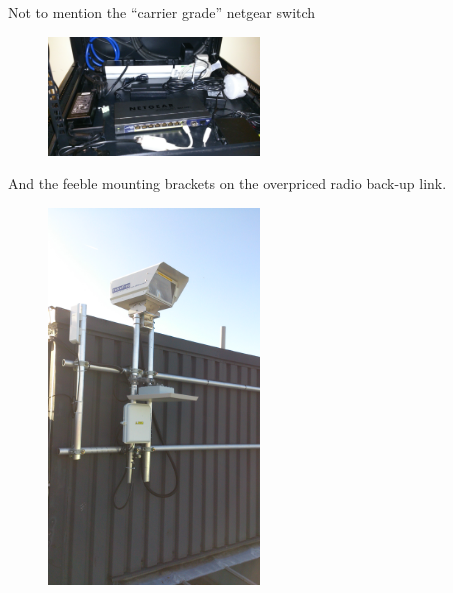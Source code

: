 Not to mention the ``carrier grade'' netgear switch
\begin{figure}[h]
  \begin{center}
    \includegraphics[width=0.5\textwidth]{carrier-grade}
  \end{center}
\end{figure}

And the feeble mounting brackets on the overpriced radio back-up link.
\begin{figure}[h]
  \begin{center}
    \includegraphics[angle=-90,width=0.5\textwidth]{also-faulty}
  \end{center}
\end{figure}

